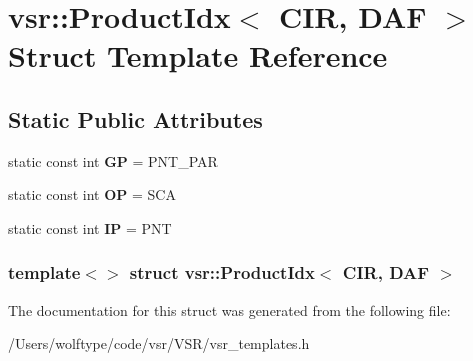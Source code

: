 \hypertarget{structvsr_1_1_product_idx_3_01_c_i_r_00_01_d_a_f_01_4}{\section{vsr\-:\-:Product\-Idx$<$ C\-I\-R, D\-A\-F $>$ Struct Template Reference}
\label{structvsr_1_1_product_idx_3_01_c_i_r_00_01_d_a_f_01_4}
}
\subsection*{Static Public Attributes}
\begin{DoxyCompactItemize}
\item 
\hypertarget{structvsr_1_1_product_idx_3_01_c_i_r_00_01_d_a_f_01_4_ab81cf4e3394bdf64199da375d23d9fd8}{static const int {\bfseries G\-P} = P\-N\-T\-\_\-\-P\-A\-R}\label{structvsr_1_1_product_idx_3_01_c_i_r_00_01_d_a_f_01_4_ab81cf4e3394bdf64199da375d23d9fd8}

\item 
\hypertarget{structvsr_1_1_product_idx_3_01_c_i_r_00_01_d_a_f_01_4_abf4d65955f88ce1c0a21f1e91b2e21d5}{static const int {\bfseries O\-P} = S\-C\-A}\label{structvsr_1_1_product_idx_3_01_c_i_r_00_01_d_a_f_01_4_abf4d65955f88ce1c0a21f1e91b2e21d5}

\item 
\hypertarget{structvsr_1_1_product_idx_3_01_c_i_r_00_01_d_a_f_01_4_a7cbeae7f7da9ec9a696925aba7ecb686}{static const int {\bfseries I\-P} = P\-N\-T}\label{structvsr_1_1_product_idx_3_01_c_i_r_00_01_d_a_f_01_4_a7cbeae7f7da9ec9a696925aba7ecb686}

\end{DoxyCompactItemize}
\subsubsection*{template$<$$>$ struct vsr\-::\-Product\-Idx$<$ C\-I\-R, D\-A\-F $>$}



The documentation for this struct was generated from the following file\-:\begin{DoxyCompactItemize}
\item 
/\-Users/wolftype/code/vsr/\-V\-S\-R/vsr\-\_\-templates.\-h\end{DoxyCompactItemize}
